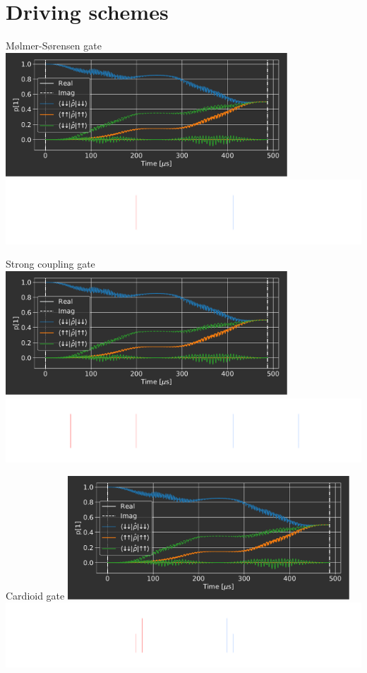 \documentclass[aspectratio=169]{beamer}
\begin{document}
	\section{Driving schemes}
	\begin{frame}{M\o lmer-S\o rensen gate}
		\centering
		\includegraphics[height=12.5em]{test.pdf}
		\includegraphics[width=0.75\linewidth]{MS-gate.pdf}
	\end{frame}
	\begin{frame}{Strong coupling gate}
		\centering
		\includegraphics[height=12.5em]{test.pdf}
		\includegraphics[width=0.75\linewidth]{SC2-gate.pdf}
	\end{frame}
	\begin{frame}{Cardioid gate}
		\centering
		\includegraphics[height=12.5em]{test.pdf}
		\includegraphics[width=0.75\linewidth]{Cardioid-gate.pdf}
	\end{frame}
\end{document}
